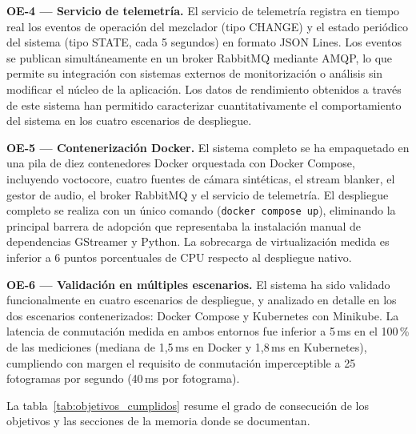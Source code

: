 \vspace{0.2cm}
\noindent\textbf{OE-4 — Servicio de telemetría.}
El servicio de telemetría registra en tiempo real los eventos de operación del mezclador
(tipo CHANGE) y el estado periódico del sistema (tipo STATE, cada 5 segundos) en
formato JSON Lines. Los eventos se publican simultáneamente en un broker RabbitMQ
mediante AMQP, lo que permite su integración con sistemas externos de monitorización
o análisis sin modificar el núcleo de la aplicación. Los datos de rendimiento
obtenidos a través de este sistema han permitido caracterizar cuantitativamente el
comportamiento del sistema en los cuatro escenarios de despliegue.

\vspace{0.2cm}
\noindent\textbf{OE-5 — Contenerización Docker.}
El sistema completo se ha empaquetado en una pila de diez contenedores Docker orquestada
con Docker Compose, incluyendo voctocore, cuatro fuentes de cámara sintéticas, el stream
blanker, el gestor de audio, el broker RabbitMQ y el servicio de telemetría. El despliegue
completo se realiza con un único comando (\texttt{docker compose up}), eliminando la
principal barrera de adopción que representaba la instalación manual de dependencias
GStreamer y Python. La sobrecarga de virtualización medida es inferior a 6 puntos
porcentuales de CPU respecto al despliegue nativo.

\vspace{0.2cm}
\noindent\textbf{OE-6 — Validación en múltiples escenarios.}
El sistema ha sido validado funcionalmente en cuatro escenarios de despliegue, y
analizado en detalle en los dos escenarios contenerizados: Docker Compose y
Kubernetes con Minikube. La latencia de conmutación medida en ambos entornos fue
inferior a 5\,ms en el 100\,\% de las mediciones (mediana de 1{,}5\,ms en Docker
y 1{,}8\,ms en Kubernetes), cumpliendo con margen el requisito de conmutación
imperceptible a 25 fotogramas por segundo (40\,ms por fotograma).

\vspace{0.4cm}
La tabla~\ref{tab:objetivos_cumplidos} resume el grado de consecución de los objetivos
y las secciones de la memoria donde se documentan.

